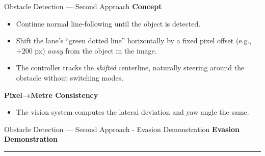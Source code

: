 \documentclass[aspectratio=169,12pt]{beamer}
\begin{document}
\begin{frame}[t]{Obstacle Detection — Second Approach}
  \vspace*{-0.3em}
  \textbf{Concept}
  \begin{itemize}\setlength{\itemsep}{0.35em}
    \item Continue normal line‑following until the object is detected.
    \item Shift the lane’s “green dotted line” horizontally by a fixed pixel offset (e.g., \(+200\) px) \emph{away} from the object in the image.
    \item The controller tracks the \emph{shifted} centerline, naturally steering around the obstacle without switching modes.
  \end{itemize}

  \vspace{0.6em}
  \textbf{Pixel→Metre Consistency}
  \begin{itemize}\setlength{\itemsep}{0.3em}
    \item The vision system computes the lateral deviation and yaw angle the same.
  \end{itemize}
\end{frame}

\begin{frame}[t]{Obstacle Detection — Second Approach - Evasion Demonstration}
  \vspace*{-0.3em}
  \textbf{Evasion Demonstration}
  
  \centering
  \rule{0pt}{6cm}\rule{0.85\linewidth}{0pt} %
  
\end{frame}
\end{document}
